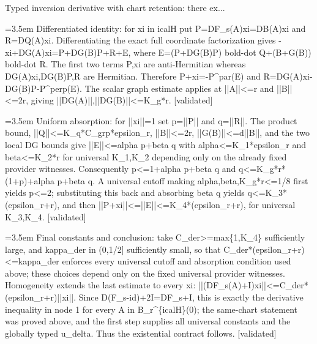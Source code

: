 \documentclass{article}
\newcommand{\step}[1]{\par\noindent\hangindent=3.5em\hangafter=1%
  \makebox[3.5em][l]{\textbf{#1.}}}
\newcommand{\steptag}[1]{\hfill{\small\textsf{[#1]}}}
\begin{document}
\begin{proofbox}{Typed inversion derivative with chart retention: there ex...}
\step{1.7} Differentiated identity: for xi in icalH put P=DF\_s(A)xi=DB(A)xi and R=DQ(A)xi. Differentiating the exact full coordinate factorization gives -xi+DG(A)xi=P+DG(B)P+R+E, where E=(P+DG(B)P) bold-dot Q+(B+G(B)) bold-dot R. The first two terms P,xi are anti-Hermitian whereas DG(A)xi,DG(B)P,R are Hermitian. Therefore P+xi=-P\textasciicircum{}par(E) and R=DG(A)xi-DG(B)P-P\textasciicircum{}perp(E). The scalar graph estimate applies at ||A||<=r and ||B||<=2r, giving ||DG(A)||,||DG(B)||<=K\_g*r. \steptag{validated} \\[4pt]
\step{1.8} Uniform absorption: for ||xi||=1 set p=||P|| and q=||R||. The product bound, ||Q||<=K\_q*C\_grp*epsilon\_r, ||B||<=2r, ||G(B)||<=d||B||, and the two local DG bounds give ||E||<=alpha p+beta q with alpha<=K\_1*epsilon\_r and beta<=K\_2*r for universal K\_1,K\_2 depending only on the already fixed provider witnesses. Consequently p<=1+alpha p+beta q and q<=K\_g*r*(1+p)+alpha p+beta q. A universal cutoff making alpha,beta,K\_g*r<=1/8 first yields p<=2; substituting this back and absorbing beta q yields q<=K\_3*(epsilon\_r+r), and then ||P+xi||<=||E||<=K\_4*(epsilon\_r+r), for universal K\_3,K\_4. \steptag{validated} \\[4pt]
\step{1.9} Final constants and conclusion: take C\_der>=max\{1,K\_4\} sufficiently large, and kappa\_der in (0,1/2] sufficiently small, so that C\_der*(epsilon\_r+r)<=kappa\_der enforces every universal cutoff and absorption condition used above; these choices depend only on the fixed universal provider witnesses. Homogeneity extends the last estimate to every xi: ||(DF\_s(A)+I)xi||<=C\_der*(epsilon\_r+r)||xi||. Since D(F\_s-id)+2I=DF\_s+I, this is exactly the derivative inequality in node 1 for every A in B\_r\textasciicircum{}\{icalH\}(0); the same-chart statement was proved above, and the first step supplies all universal constants and the globally typed u\_delta. Thus the existential contract follows. \steptag{validated} \\[4pt]
\end{proofbox}
\end{document}
